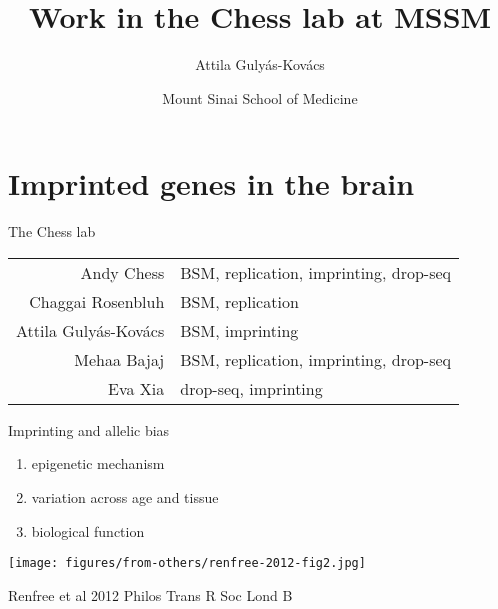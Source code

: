 \documentclass{beamer} %
\title{Work in the Chess lab at MSSM}
\author{Attila Guly\'{a}s-Kov\'{a}cs}
\date{Mount Sinai School of Medicine}
\begin{document}
\begin{frame}[plain, label=title]
\maketitle
\end{frame}

\section{Imprinted genes in the brain}


\begin{frame}[label=chess-lab]{The Chess lab}
\begin{tabular}{r|l}
Andy Chess & BSM, replication, imprinting, drop-seq \\
Chaggai Rosenbluh & BSM, replication \\
Attila Guly\'{a}s-Kov\'{a}cs & BSM, imprinting \\
Mehaa Bajaj & BSM, replication, imprinting, drop-seq \\
Eva Xia & drop-seq, imprinting \\
\end{tabular}
\end{frame}

\begin{frame}{Imprinting and allelic bias}
\begin{enumerate}
\item epigenetic mechanism
\item variation across age and tissue
\item biological function 
\end{enumerate}
\texttt{[image: figures/from-others/renfree-2012-fig2.jpg]}

{\tiny Renfree et al 2012 Philos Trans R Soc Lond B}

\end{frame}

%
%
%
\end{document}
